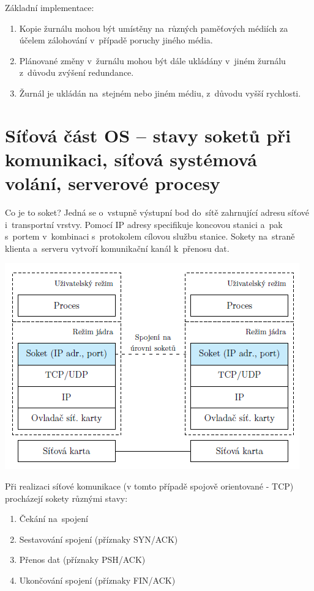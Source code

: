 Základní implementace:

\begin{enumerate}
    \item Kopie žurnálu mohou být umístěny na~různých paměťových médiích za účelem zálohování v~případě poruchy jiného média.
    \item Plánované změny v~žurnálu mohou být dále ukládány v~jiném žurnálu z~důvodu zvýšení redundance.
    \item Žurnál je ukládán na~stejném nebo jiném médiu, z~důvodu vyšší rychlosti. 
\end{enumerate}


\clearpage
\section{Síťová část OS -- stavy soketů při komunikaci, síťová systémová volání, serverové procesy}

Co je to soket? Jedná se o~vstupně výstupní bod do~sítě zahrnující adresu síťové i~transportní vrstvy. Pomocí IP adresy specifikuje koncovou stanici a~pak s~portem v~kombinaci s~protokolem cílovou službu stanice. Sokety na~straně klienta a~serveru vytvoří komunikační kanál k~přenosu dat.

\begin{center}
    \includegraphics[scale=1]{images/network_socket.png}
\end{center}

Při realizaci síťové komunikace (v tomto případě spojově orientované - TCP) procházejí sokety různými stavy:
\begin{enumerate}
    \item Čekání na~spojení
    \item Sestavování spojení (příznaky SYN/ACK)
    \item Přenos dat (příznaky PSH/ACK)
    \item Ukončování spojení (příznaky FIN/ACK)
\end{enumerate}

